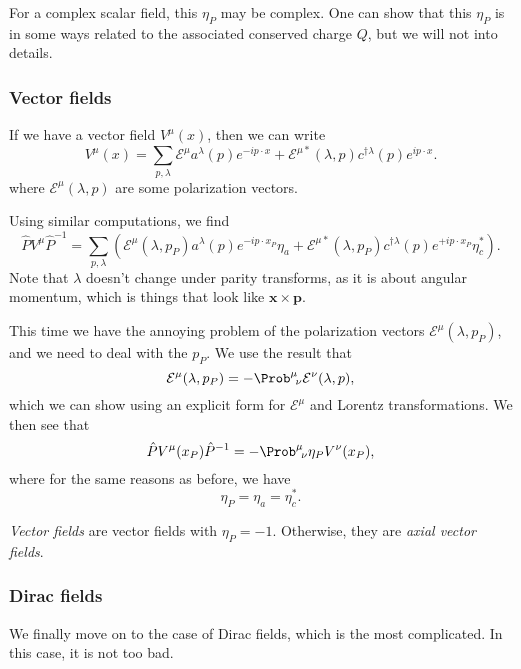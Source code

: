 \documentclass[a4paper]{article}
\begin{document}
For a complex scalar field, this $\eta_P$ may be complex. One can show that this $\eta_P$ is in some ways related to the associated conserved charge $Q$, but we will not into details.

\subsubsection*{Vector fields}

If we have a vector field $V^\mu (x)$, then we can write
\[
  V^\mu(x) = \sum_{p, \lambda} \mathcal{E}^\mu a^\lambda(p) e^{-ip\cdot x} + \mathcal{E}^{\mu *} (\lambda, p) c^{\dagger \lambda} (p) e^{ip\cdot x}.
\]
where $\mathcal{E}^\mu(\lambda, p)$ are some polarization vectors.

Using similar computations, we find
\[
  \hat{P} V^\mu \hat{P}^{-1} = \sum_{p, \lambda} \left(\mathcal{E}^\mu (\lambda, p_P)a^\lambda(p) e^{-ip\cdot x_P} \eta_a + \mathcal{E}^{\mu*}(\lambda, p_P) c^{\dagger\lambda} (p) e^{+ip\cdot x_P} \eta_c^*\right).
\]
Note that $\lambda$ doesn't change under parity transforms, as it is about angular momentum, which is things that look like $\mathbf{x} \times \mathbf{p}$.

This time we have the annoying problem of the polarization vectors $\mathcal{E}^\mu(\lambda, p_P)$, and we need to deal with the $p_P$. We use the result that
\[
  \mathcal{E}^\mu(\lambda, p_P) = - \Prob^\mu\!_\nu \mathcal{E}^\nu (\lambda, p),
\]
which we can show using an explicit form for $\mathcal{E}^\mu$ and Lorentz transformations. We then see that
\[
  \hat{P} V^\mu(x_P) \hat{P}^{-1} = - \Prob^\mu\!_\nu \eta_P V^\nu(x_P),
\]
where for the same reasons as before, we have
\[
  \eta_P = \eta_a = \eta_c^*.
\]
\begin{defi}
  \emph{Vector fields} are vector fields with $\eta_P = -1$. Otherwise, they are \emph{axial vector fields}.
\end{defi} %

\subsubsection*{Dirac fields}
We finally move on to the case of Dirac fields, which is the most complicated. In this case, it is not too bad.
\end{document}
